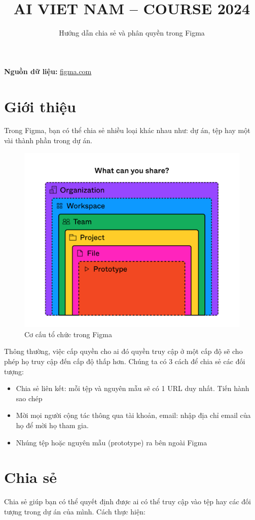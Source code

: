 \documentclass[11pt]{article}
\title{\LARGE AI VIET NAM – COURSE 2024}
\author{\Huge \begin{minipage}{\textwidth}\centering Hướng dẫn chia sẻ và phân quyền trong Figma \end{minipage}}
\begin{document}
\maketitle

\textbf{Nguồn dữ liệu:} \href{https://help.figma.com/hc/en-us/sections/1500001331382-Sharing-and-permissions}{figma.com}

\section{Giới thiệu}

Trong Figma, bạn có thể chia sẻ nhiều loại khác nhau như: dự án, tệp hay một vài thành phần trong dự án.
\begin{figure}[!h]
    \centering
    \includegraphics[width=0.8\linewidth]{imgs/share.png}
    \caption{Cơ cấu tổ chức trong Figma}
\end{figure}

Thông thường, việc cấp quyền cho ai đó quyền truy cập ở một cấp độ sẽ cho phép họ truy cập đến cấp độ thấp hơn. Chúng ta có 3 cách để chia sẻ các đối tượng:

\begin{itemize}
    \item Chia sẻ liên kết: mỗi tệp và nguyên mẫu sẽ có 1 URL duy nhất. Tiến hành sao chép
    \item Mời mọi người cộng tác thông qua tài khoản, email: nhập địa chỉ email của họ để mời họ tham gia.
    \item Nhúng tệp hoặc nguyên mẫu (prototype) ra bên ngoài Figma
\end{itemize}

\section{Chia sẻ}
Chia sẻ giúp bạn có thể quyết định được ai có thể truy cập vào tệp hay các đối tượng trong dự án của mình. Cách thực hiện:
\end{document}

